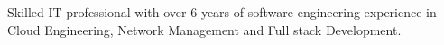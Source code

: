 \documentclass[letter,10pt]{article}
\begin{document}

Skilled IT professional with over 6 years of software engineering experience in
Cloud Engineering, Network Management and Full stack Development.
\end{document}
